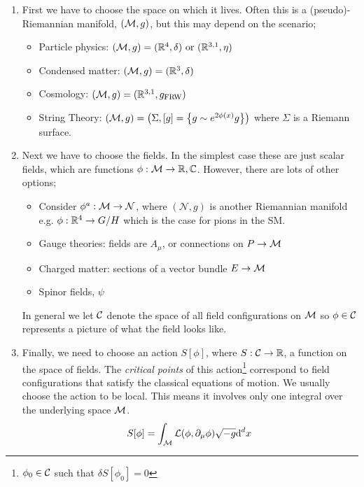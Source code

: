 \begin{enumerate}
\item First we have to choose the space on which it lives. Often this is a (pseudo)-Riemannian manifold, $(\mathcal{M}, g)$, but this may depend on the scenario;
\begin{itemize}
\item Particle physics: $(\mathcal{M}, g) = (\mathbb{R}^4, \delta) \,\,\text{or}\,\,(\mathbb{R}^{3,1}, \eta)$
\item Condensed matter: $(\mathcal{M}, g) = (\mathbb{R}^3, \delta)$
\item Cosmology: $(\mathcal{M}, g) = (\mathbb{R}^{3,1}, g_{\text{FRW}})$
\item String Theory: $(\mM, g) = \left(\Sigma, [g] = \set{g \sim e^{2\phi(x)}g}\right)$ where $\Sigma$ is a Riemann surface.
\end{itemize}
\item Next we have to choose the fields. In the simplest case these are just scalar fields, which are functions $\phi : \mathcal{M} \rightarrow \mathbb{R}, \mathbb{C}$. However, there are lots of other options;
\begin{itemize}
\item Consider $\phi^a : \mathcal{M} \rightarrow \mathcal{N}$, where $(\mathcal{N}, g)$ is another Riemannian manifold e.g. $\phi : \mathbb{R}^4 \rightarrow G / H$ which is the case for pions in the SM.
\item Gauge theories: fields are $A_{\mu}$, or connections on $P \rightarrow \mathcal{M}$
\item Charged matter: sections of a vector bundle $E \rightarrow \mathcal{M}$
\item Spinor fields, $\psi$
\end{itemize}
In general we let $\mathcal{C}$ denote the space of all field configurations on $\mathcal{M}$ so $\phi \in \mathcal{C}$ represents a picture of what the field looks like.
\item Finally, we need to choose an action $S\left[\phi\right]$, where $S : \mathcal{C} \rightarrow \mathbb{R}$, a function on the space of fields. The \emph{critical points} of this action\footnote{$\phi_0 \in \mathcal{C}$ such that $\delta S\left[\phi_0\right] = 0$} correspond to field configurations that satisfy the classical equations of motion. We usually choose the action to be local. This means it involves only one integral over the underlying space $\mathcal{M}$.\footnotemark
\begin{equation}
S\left[\phi\right] = \int_{\mM}{\mL(\phi, \del_\mu \phi)\sqrt{-g}\upd{^d x}}
\end{equation}
\end{enumerate}

